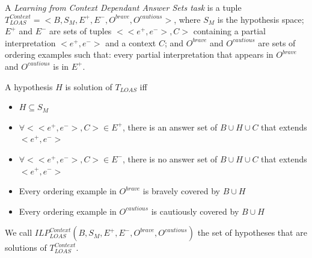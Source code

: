 \begin{definition}
A \textit{Learning from Context Dependant Answer Sets task} is a tuple $T_{LOAS}^{Context}=<B, S_M, E^+, E^-,O^{brave}, O^{cautious}>$, where $S_M$ is the hypothesis space; $E^+$ and $E^-$ are sets of tuples $<<e^+,e^->,C>$ containing a partial interpretation $<e^+,e^->$ and a context $C$; and $O^{brave}$ and $O^{cautious}$ are sets of ordering examples such that: every partial interpretation that appears in $O^{brave}$ and $O^{cautious}$ is in $E^+$.

\smallskip

A hypothesis $H$ is solution of $T_{LOAS}$ iff 
\begin{itemize}
\item $H\subseteq S_M$
\item $\forall <<e^+,e^->,C>\in E^+$, there is an answer set of $B\cup H \cup C$ that extends $<e^+,e^->$
\item $\forall <<e^+,e^->,C>\in E^-$, there is no answer set of $B\cup H \cup C$ that extends $<e^+,e^->$
\item Every ordering example in $O^{brave}$ is bravely covered by $B\cup H$
\item Every ordering example in $O^{cautious}$ is cautiously covered by $B\cup H$
\end{itemize}

We call $ILP_{LOAS}^{Context}(B,S_M,E^+,E^-,O^{brave},O^{cautious})$ the set of hypotheses that are solutions of $T_{LOAS}^{Context}$.
\end{definition}

